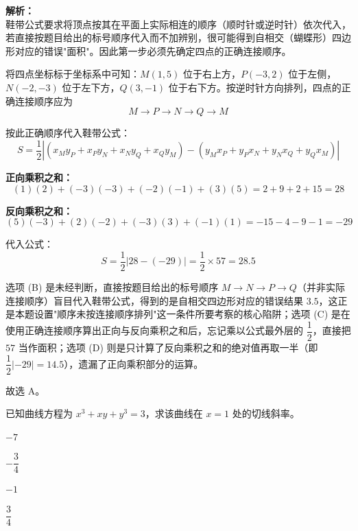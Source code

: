 \documentclass[12pt,a4paper]{exam-zh}
\begin{document}
\begin{solution}
    \textbf{解析：} \\
    鞋带公式要求将顶点按其在平面上实际相连的顺序（顺时针或逆时针）依次代入，若直接按题目给出的标号顺序代入而不加辨别，很可能得到自相交（蝴蝶形）四边形对应的错误"面积"。因此第一步必须先确定四点的正确连接顺序。

    将四点坐标标于坐标系中可知：$M(1,5)$ 位于右上方，$P(-3,2)$ 位于左侧，$N(-2,-3)$ 位于左下方，$Q(3,-1)$ 位于右下方。按逆时针方向排列，四点的正确连接顺序应为
    \[ \displaystyle M \to P \to N \to Q \to M \]

    按此正确顺序代入鞋带公式：
    \[ \displaystyle S = \frac{1}{2}\left|(x_My_P+x_Py_N+x_Ny_Q+x_Qy_M)-(y_Mx_P+y_Px_N+y_Nx_Q+y_Qx_M)\right| \]

    \textbf{正向乘积之和：}
    \[ \displaystyle (1)(2)+(-3)(-3)+(-2)(-1)+(3)(5) = 2+9+2+15 = 28 \]

    \textbf{反向乘积之和：}
    \[ \displaystyle (5)(-3)+(2)(-2)+(-3)(3)+(-1)(1) = -15-4-9-1 = -29 \]

    代入公式：
    \[ \displaystyle S = \frac{1}{2}\left|28-(-29)\right| = \frac{1}{2}\times 57 = 28.5 \]

    选项 (B) 是未经判断，直接按题目给出的标号顺序 $M \to N \to P \to Q$（并非实际连接顺序）盲目代入鞋带公式，得到的是自相交四边形对应的错误结果 $3.5$，这正是本题设置"顺序未按连接顺序排列"这一条件所要考察的核心陷阱；选项 (C) 是在使用正确连接顺序算出正向与反向乘积之和后，忘记乘以公式最外层的 $\dfrac12$，直接把 $57$ 当作面积；选项 (D) 则是只计算了反向乘积之和的绝对值再取一半（即 $\dfrac12|-29|=14.5$），遗漏了正向乘积部分的运算。

    故选 A。
\end{solution}

\begin{question}
    已知曲线方程为 $x^3 + xy + y^3 = 3$，求该曲线在 $x = 1$ 处的切线斜率。\paren[C]
    \begin{choices}
        \item $-7$
        \item $-\dfrac{3}{4}$
        \item $-1$
        \item $\dfrac{3}{4}$
    \end{choices}
\end{question}
\end{document}
